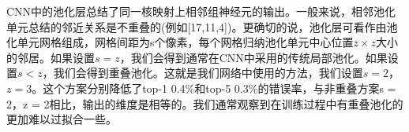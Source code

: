 CNN中的池化层总结了同一核映射上相邻组神经元的输出。一般来说，相邻池化单元总结的邻近关系是不重叠的(例如[17,11,4])。更确切的说，池化层可看作由池化单元网格组成，网格间距为s个像素，每个网格归纳池化单元中心位置$z\times z$大小的邻居。如果设置$s=z$，我们会得到通常在CNN中采用的传统局部池化。如果设置$s < z$，我们会得到重叠池化。这就是我们网络中使用的方法，我们设置$s = 2$，$z = 3$。这个方案分别降低了top-1  0.4\%和top-5  0.3\%的错误率，与非重叠方案s = 2，z = 2相比，输出的维度是相等的。我们通常观察到在训练过程中有重叠池化的更加难以过拟合一些。